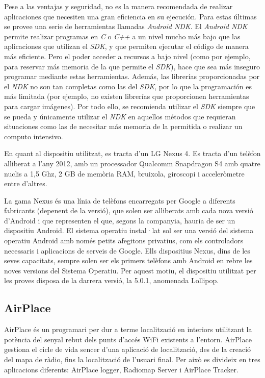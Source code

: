 Pese a las ventajas y seguridad, no es la manera recomendada de realizar aplicaciones que necesiten una gran eficiencia en su ejecución. Para estas últimas se provee una serie de herramientas llamadas \textit{Android \textit{NDK}}. El \textit{Android \textit{NDK}} permite realizar programas en \textit{C} o \textit{C++} a un nivel mucho más bajo que las aplicaciones que utilizan el \textit{SDK}\cite{android1}, y que permiten ejecutar el código de manera más eficiente. Pero el poder acceder a recursos a bajo nivel (como por ejemplo, para reservar más memoria de la que permite el \textit{SDK}), hace que sea más inseguro programar mediante estas herramientas. Además, las librerías proporcionadas por el \textit{NDK} no son tan completas como las del \textit{SDK}, por lo que la programación es más limitada (por ejemplo, no existen librerías que proporcionen herramientas para cargar imágenes). Por todo ello, se recomienda utilizar el \textit{SDK} siempre que se pueda y únicamente utilizar el \textit{NDK} en aquellos métodos que requieran situaciones como las de necesitar más memoria de la permitida o realizar un computo intensivo.

En quant al dispositiu utilitzat, es tracta d'un LG Nexus 4. Es tracta d'un telèfon alliberat a l'any 2012, amb un processador Qualcomm Snapdragon S4 amb quatre nuclis a 1,5 Ghz, 2 GB de memòria RAM, bruixola, giroscopi i acceleròmetre entre d'altres.

 La gama Nexus és una línia de telèfons encarregats per Google a diferents fabricants (depenent de la versió), que solen ser alliberats amb cada nova versió d'Android i que representen el que, segons la companyia, hauria de ser un dispositiu Android. El sistema operatiu instal·lat sol ser una versió del sistema operatiu Android amb només petits afegitons privatius, com els controladors necessaris i aplicacions de serveis de Google. Ells dispositius Nexus, dins de les seves capacitats, sempre solen ser els primers telèfons amb Android en rebre les noves versions del Sistema Operatiu. Per aquest motiu, el dispositiu utilitzat per les proves disposa de la darrera versió, la 5.0.1, anomenada Lollipop.




\subsection{AirPlace}

AirPlace és un programari per dur a terme localització en interiors utilitzant la potència del senyal rebut dels punts d'accés WiFi existents a l'entorn. AirPlace gestiona el cicle de vida sencer d'una aplicació de localització, des de la creació del mapa de ràdio, fins la localització de l'usuari final. Per això es divideix en tres aplicacions diferents: AirPlace logger, Radiomap Server i AirPlace Tracker.

